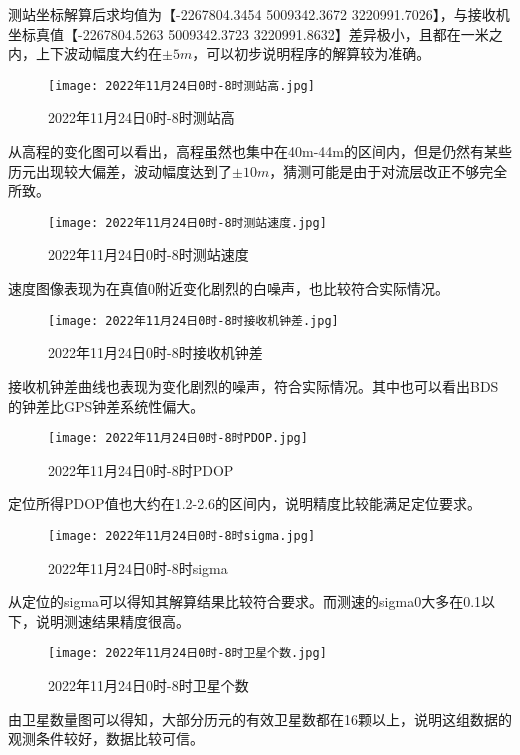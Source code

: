 \documentclass{ctexart}
\begin{document}
测站坐标解算后求均值为【-2267804.3454 5009342.3672 3220991.7026】，与接收机坐标真值【-2267804.5263 5009342.3723 3220991.8632】差异极小，且都在一米之内，上下波动幅度大约在$\pm5m$，可以初步说明程序的解算较为准确。

\begin{figure}[H]
\texttt{[image: 2022年11月24日0时-8时测站高.jpg]}
\caption{2022年11月24日0时-8时测站高}
\end{figure}

从高程的变化图可以看出，高程虽然也集中在40m-44m的区间内，但是仍然有某些历元出现较大偏差，波动幅度达到了$\pm10m$，猜测可能是由于对流层改正不够完全所致。

\begin{figure}[H]
\texttt{[image: 2022年11月24日0时-8时测站速度.jpg]}
\caption{2022年11月24日0时-8时测站速度}
\end{figure}

速度图像表现为在真值0附近变化剧烈的白噪声，也比较符合实际情况。

\begin{figure}[H]
\texttt{[image: 2022年11月24日0时-8时接收机钟差.jpg]}
\caption{2022年11月24日0时-8时接收机钟差}
\end{figure}
接收机钟差曲线也表现为变化剧烈的噪声，符合实际情况。其中也可以看出BDS的钟差比GPS钟差系统性偏大。

\begin{figure}[H]
\texttt{[image: 2022年11月24日0时-8时PDOP.jpg]}
\caption{2022年11月24日0时-8时PDOP}
\end{figure}
定位所得PDOP值也大约在1.2-2.6的区间内，说明精度比较能满足定位要求。

\begin{figure}[H]
\texttt{[image: 2022年11月24日0时-8时sigma.jpg]}
\caption{2022年11月24日0时-8时sigma}
\end{figure}
从定位的sigma可以得知其解算结果比较符合要求。而测速的sigma0大多在0.1以下，说明测速结果精度很高。


\begin{figure}[H]
\texttt{[image: 2022年11月24日0时-8时卫星个数.jpg]}
\caption{2022年11月24日0时-8时卫星个数}
\end{figure}

由卫星数量图可以得知，大部分历元的有效卫星数都在16颗以上，说明这组数据的观测条件较好，数据比较可信。
\newpage
\end{document}
